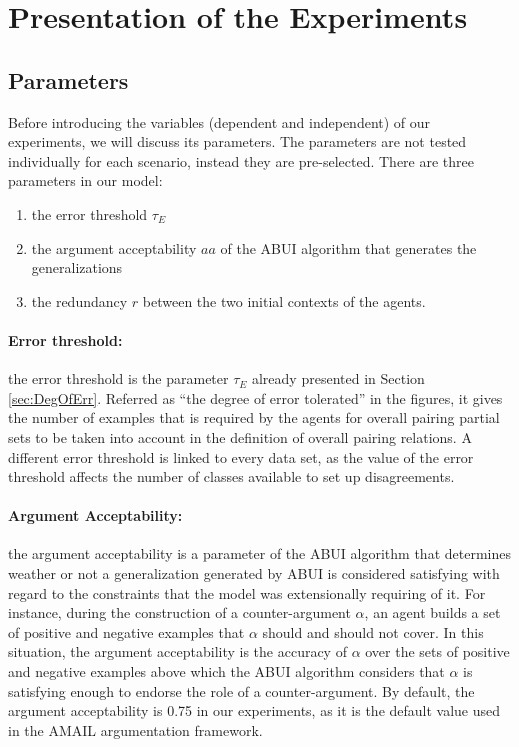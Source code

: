 \section{Presentation of the Experiments}

\subsection{Parameters}
Before introducing the variables (dependent and independent) of our experiments, we will discuss its parameters. The parameters are not tested individually for each scenario, instead they are pre-selected. There are three parameters in our model:

\begin{enumerate}
    \item the error threshold $\tau_{E}$
    \item the argument acceptability $aa$ of the ABUI algorithm that generates the generalizations
    \item the redundancy $r$ between the two initial contexts of the agents.
\end{enumerate}

\paragraph{Error threshold:} the error threshold is the parameter $\tau_{E}$ already presented in Section \ref{sec:DegOfErr}. Referred as ``the degree of error tolerated'' in the figures, it gives the number of examples that is required by the agents for overall pairing partial sets to be taken into account in the definition of overall pairing relations. A different error threshold is linked to every data set, as the value of the error threshold affects the number of classes available to set up disagreements.

\paragraph{Argument Acceptability:} the argument acceptability is a parameter of the ABUI algorithm that determines weather or not a generalization generated by ABUI is considered satisfying with regard to the constraints that the model was extensionally requiring of it. For instance, during the construction of a counter-argument $\alpha$, an agent builds a set of positive and negative examples that $\alpha$ should and should not cover. In this situation, the argument acceptability is the accuracy of $\alpha$ over the sets of positive and negative examples above which the ABUI algorithm considers that $\alpha$ is satisfying enough to endorse the role of a counter-argument. By default, the argument acceptability is 0.75 in our experiments, as it is the default value used in the AMAIL argumentation framework.

